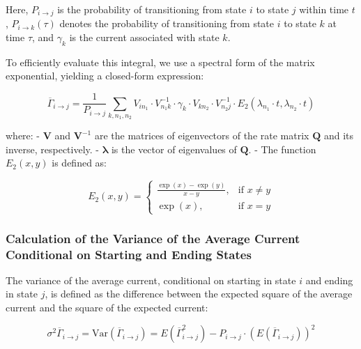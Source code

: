 \documentclass[pdflatex,sn-mathphys-num]{sn-jnl}%
\theoremstyle{thmstyleone}%
\theoremstyle{thmstyletwo}%
\theoremstyle{thmstylethree}%
\begin{document}
Here, \( P_{i \rightarrow j} \) is the probability of transitioning from state \( i \) to state \( j \) within time \( t \), \( P_{i \rightarrow k}(\tau) \) denotes the probability of transitioning from state \( i \) to state \( k \) at time \( \tau \), and \( \gamma_k \) is the current associated with state \( k \).

To efficiently evaluate this integral, we use a spectral form of the matrix exponential, yielding a closed-form expression:

\begin{equation}
	\overline{\Gamma}_{i \rightarrow j} = \frac{1}{P_{i \rightarrow j}} \sum_{k, n_1, n_2} V_{i n_1} \cdot V^{-1}_{n_1 k} \cdot \gamma_k \cdot V_{k n_2} \cdot V^{-1}_{n_2 j} \cdot E_2(\lambda_{n_1} \cdot t, \lambda_{n_2} \cdot t)
	\label{eq:gamma_ij_formula}
\end{equation}

where:
- \( \mathbf{V} \) and \( \mathbf{V}^{-1} \) are the matrices of eigenvectors of the rate matrix \( \mathbf{Q} \) and its inverse, respectively.
- \( \boldsymbol{\lambda} \) is the vector of eigenvalues of \( \mathbf{Q} \).
- The function \( E_2(x, y) \) is defined as:

\begin{equation}
	E_2(x, y) = 
	\begin{cases}
		\frac{\exp(x) - \exp(y)}{x - y}, & \text{if } x \neq y \\
		\exp(x), & \text{if } x = y
	\end{cases}
    \label{eq:E_2}
\end{equation}


\subsubsection{Calculation of the Variance of the Average Current Conditional on Starting and Ending States}

The variance of the average current, conditional on starting in state \(i\) and ending in state \(j\), is defined as the difference between the expected square of the average current and the square of the expected current:

\begin{equation}
	\sigma^2 \overline{\Gamma}_{i \rightarrow j}=\text{Var}(\overline{\Gamma}_{i \rightarrow j}) = E(\overline{\Gamma}_{i \rightarrow j}^2) - P_{i \rightarrow j} \cdot \left( E(\overline{\Gamma}_{i \rightarrow j}) \right)^2
    \label{eq:sigma_gamma_expression}
\end{equation}
\end{document}
